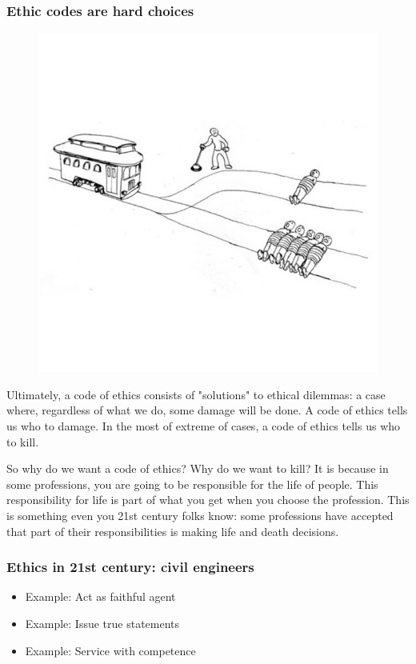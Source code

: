 \begin{frame}[fragile]
\frametitle{Ethic codes are hard choices}

\begin{figure}
\includegraphics[scale=0.25]{trolley}
\end{figure}

\end{frame}

Ultimately, a code of ethics consists of
"solutions"
to ethical dilemmas:
a case where,
regardless of what we do,
some damage will be done.
A code of ethics tells us who to damage.
In the most of extreme of cases,
a code of ethics tells us who to kill.

So why do we want a code of ethics?
Why do we want to kill?
It is because in some professions,
you are going to be responsible for the life of people.
This responsibility for life is part of what you get
when you choose the profession.
This is something even you 21st century folks know:
some professions have accepted that part of their responsibilities
is making life and death decisions.

\begin{frame}[fragile]
\frametitle{Ethics in 21st century: civil engineers}

\begin{itemize}
\item Example: Act as faithful agent\pause
\item Example: Issue true statements\pause
\item Example: Service with competence
\end{itemize}

\end{frame}

